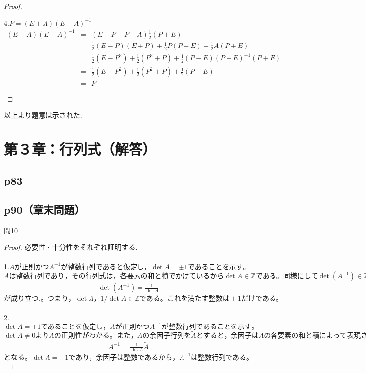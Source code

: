 \documentclass[dvipdfmx,uplatex,11pt]{jsarticle}
\begin{document}
\begin{proof}
%
%
%
\newpage
%
%
%
\begin{leftbar}
4.$P= (E + A)(E − A)^{−1}$
\begin{eqnarray*}
(E + A)(E − A)^{−1}&=&(E − P + P + A)\frac{1}{2}(P + E)\\
&=&\frac{1}{2}(E − P)(E + P)+\frac{1}{2}P(P + E)+\frac{1}{2}A(P + E)\\
&=&\frac{1}{2}(E − P^2) +\frac{1}{2}(P^2+P)+\frac{1}{2}(P − E)(P + E)^{−1}(P + E)\\
&=&\frac{1}{2}(E − P^2)+\frac{1}{2}(P^2+P)+\frac{1}{2}(P − E)\\
&=&P
\end{eqnarray*}
\end{leftbar}
\end{proof}
以上より題意は示された.
%
%
%
\newpage
%
%
%
\section{第３章：行列式（解答）}
\subsection{p83}
%
%
%
\newpage
%
%
%
\subsection{p90（章末問題）}
問10\\
\noindent
\begin{leftbar}
\begin{proof}
必要性・十分性をそれぞれ証明する.\\ \\
1.$Aが正則かつA^{−1}が整数行列であると仮定し，\det A=\pm 1であることを示す。$\\
$Aは整数行列であり，その行列式は，各要素の和と積でかけているから\det A \in \mathbb{Z}である。同様にして\det (A^{−1}) \in \mathbb{Z}である。逆行列の行列式は，$
\begin{eqnarray*}
\det (A^{−1})=\frac{1}{\det A}
\end{eqnarray*}
$が成り立つ.。つまり，\det A，1/\det A \in \mathbb{Z} である。これを満たす整数は\pm 1だけである。$\\
\\
2.$\det A=\pm 1であることを仮定し，Aが正則かつA^{−1}が整数行列であることを示す。$\\
$\det A \neq 0 より A の正則性がわかる。また，Aの余因子行列を\tilde{A}とすると，余因子はAの各要素の和と積によって表現される。つまり，余因子は整数であるから\tilde{A}は整数行列である. また$
\begin{eqnarray*}
A^{−1}=\frac{1}{\det A}\tilde{A}
\end{eqnarray*}
$となる。\det A=\pm 1であり， 余因子は整数であるから，A^{−1}は整数行列である。$
\end{proof}
\end{leftbar}
%
%
%
\newpage
%
%
%
\end{document}
